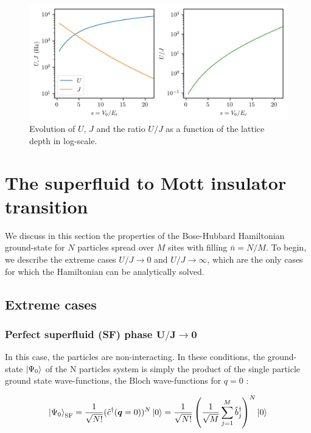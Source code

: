 \begin{figure}
    \centering
    \includegraphics[width=\textwidth]{Fig/Chapter2/U_J_vs_s.png}
    \caption{Evolution of $U$, $J$ and the ratio $U/J$ as a function of the lattice depth in log-scale.}
    \label{fig:U_J_vs_s}
\end{figure}

\section{The superfluid to Mott insulator transition}

We discuss in this section the properties of the Bose-Hubbard Hamiltonian ground-state for $N$ particles spread over $M$ sites with filling $\bar{n}=N/M$. To begin, we describe the extreme cases $U/J \to 0$ and $U/J \to \infty$, which are the only cases for which the Hamiltonian can be analytically solved. 

\subsection{Extreme cases}

\subsubsection{Perfect superfluid (SF) phase $\bm{U/J \to 0}$}

In this case, the particles are non-interacting. In these conditions, the ground-state $\ket{\Psi_0}$ of the N particles system is simply the product of the single particle ground state wave-functions, \ie the Bloch wave-functions for $q=0$ \cite{bloch2008many}:

\begin{equation}
    \ket{\Psi_0}_{\mathrm{SF}} = \frac{1}{\sqrt{N!}} (\hat{c}^{\dagger}(\bm{q}=0))^N \ket{0} = \frac{1}{\sqrt{N !}}\left(\frac{1}{\sqrt{M}} \sum_{j=1}^{M} \hat{b}_{j}^{\dagger}\right)^{N} \ket{0}
\end{equation}

